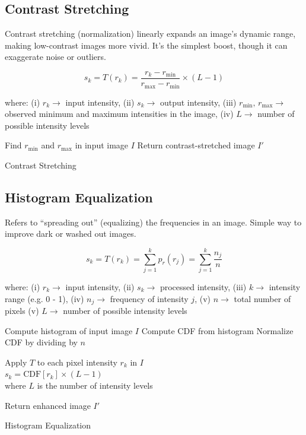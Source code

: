 \subsection*{Contrast Stretching}

Contrast stretching (normalization) linearly expands an image’s dynamic range, making low-contrast images more vivid. It’s the simplest boost, though it can exaggerate noise or outliers.

\begin{equation*}
  s_k = T(r_k)
      = \frac{r_k - r_{\min}}{r_{\max} - r_{\min}}
        \times (L - 1)
\end{equation*}

where: (i) $r_k\rightarrow$ input intensity, (ii) $s_k\rightarrow$ output intensity, (iii) $r_{\min},\,r_{\max}\rightarrow$ observed minimum and maximum intensities in the image, (iv) $L\rightarrow$ number of possible intensity levels

\begin{algorithm}[ht!]
    \DontPrintSemicolon
    Find $r_{\min}$ and $r_{\max}$ in input image $I$ \;
    {
    }
    Return contrast-stretched image $I'$\;
    \caption{Contrast Stretching}
\end{algorithm}

\subsection*{Histogram Equalization}

Refers to \enquote{spreading out} (equalizing) the frequencies in an image. Simple way to improve dark or washed out images.

\begin{equation*}
  s_k = T(r_k) = \sum_{j=1}^{k} p_r(r_j) = \sum_{j=1}^{k} \frac{n_j}{n}
\end{equation*}

where: (i) $r_k \rightarrow$ input intensity, (ii) $s_k \rightarrow$ processed intensity, (iii) $k \rightarrow$ intensity range (e.g. 0 - 1), (iv) $n_j \rightarrow$ frequency of intensity $j$, (v) $n \rightarrow$ total number of pixels (v) $L\rightarrow$ number of possible intensity levels

\begin{algorithm}[ht!]
    \DontPrintSemicolon
    Compute histogram of input image $I$ \;
    Compute CDF from histogram \;
    Normalize CDF by dividing by $n$ \;

    {
      Apply $T$ to each pixel intensity $r_k$ in $I$\\
      \nonl $s_k = \text{CDF}[r_k] \times (L - 1)$ \\
      \nonl where $L$ is the number of intensity levels \;
    }

    Return enhanced image $I'$\;
    \caption{Histogram Equalization}
\end{algorithm}

